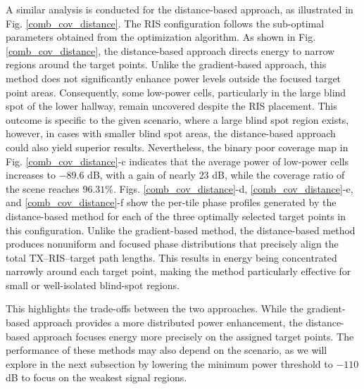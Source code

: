 \documentclass{IEEEoj}
\begin{document}
A similar analysis is conducted for the distance-based approach, as illustrated in Fig. \ref{comb_cov_distance}. The RIS configuration follows the sub-optimal parameters obtained from the optimization algorithm. As shown in Fig. \ref{comb_cov_distance}, the distance-based approach directs energy to narrow regions around the target points. Unlike the gradient-based approach, this method does not significantly enhance power levels outside the focused target point areas. Consequently, some low-power cells, particularly in the large blind spot of the lower hallway, remain uncovered despite the RIS placement. This outcome is specific to the given scenario, where a large blind spot region exists, however, in cases with smaller blind spot areas, the distance-based approach could also yield superior results. Nevertheless, the binary poor coverage map in Fig. \ref{comb_cov_distance}-c indicates that the average power of low-power cells increases to $-89.6$ dB, with a gain of nearly $23$ dB, while the coverage ratio of the scene reaches $96.31\%$. Figs. \ref{comb_cov_distance}-d, \ref{comb_cov_distance}-e, and \ref{comb_cov_distance}-f show the per-tile phase profiles generated by the distance-based method for each of the three optimally selected target points in this configuration. Unlike the gradient-based method, the distance-based method produces nonuniform and focused phase distributions that precisely align the total TX–RIS–target path lengths. This results in energy being concentrated narrowly around each target point, making the method particularly effective for small or well-isolated blind-spot regions.

This highlights the trade-offs between the two approaches. While the gradient-based approach provides a more distributed power enhancement, the distance-based approach focuses energy more precisely on the assigned target points. The performance of these methods may also depend on the scenario, as we will explore in the next subsection by lowering the minimum power threshold to $-110$ dB to focus on the weakest signal regions.
\end{document}
